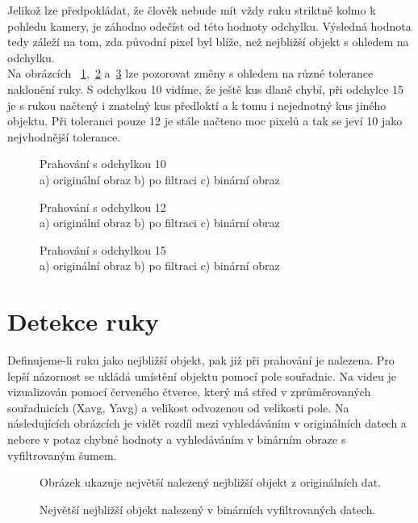 Jelikož lze předpokládat, že člověk nebude mít vždy ruku striktně kolmo k pohledu kamery, je záhodno odečíst od této hodnoty odchylku. Výsledná hodnota tedy záleží na tom, zda původní pixel byl blíže, než nejbližší objekt s ohledem na odchylku.\\
Na obrázcích ~\ref{pic12},~\ref{pic13} a~\ref{pic14} lze pozorovat změny s ohledem na různé tolerance naklonění ruky. S odchylkou 10 vidíme, že ještě kus dlaně chybí, při odchylce 15 je s rukou načtený i znatelný kus předloktí a k tomu i nejednotný kus jiného objektu. Při toleranci pouze 12 je stále načteno moc pixelů a tak se jeví 10 jako nejvhodnější tolerance.\\

\begin{figure}[htp]
\centering
{} \hfill
{} \hfill
{}
\caption{Prahování s odchylkou 10 \\ a) originální obraz b) po filtraci c) binární obraz}
\label{pic12}
\end{figure}
\begin{figure}[htp]
\centering
{} \hfill
{} \hfill
{}
\caption{Prahování s odchylkou 12 \\ a) originální obraz b) po filtraci c) binární obraz}
\label{pic13}
\end{figure}
\begin{figure}[htp]
\centering
{} \hfill
{} \hfill
{}
\caption{Prahování s odchylkou 15 \\ a) originální obraz b) po filtraci c) binární obraz}
\label{pic14}
\end{figure}
\newpage
\section{Detekce ruky}
Definujeme-li ruku jako nejbližší objekt, pak již při prahování je nalezena. Pro lepší názornost se ukládá umístění objektu pomocí pole souřadnic. Na videu je vizualizován pomocí červeného čtverce, který má střed v zprůměrovaných souřadnicích (Xavg, Yavg) a velikost odvozenou od velikosti pole. 
Na následujících obrázcích je vidět rozdíl mezi vyhledáváním v originálních datech a nebere v potaz chybné hodnoty a vyhledáváním v binárním obraze s vyfiltrovaným šumem.
\begin{figure}[htp]
\centering
{}
\caption{Obrázek ukazuje největší nalezený nejbližší objekt z originálních dat.}
\label{pic15}
\end{figure}
\begin{figure}[htp]
\centering
{}
\caption{Největší nejbližší objekt nalezený v binárních vyfiltrovaných datech.}
\label{pic16}
\end{figure}

